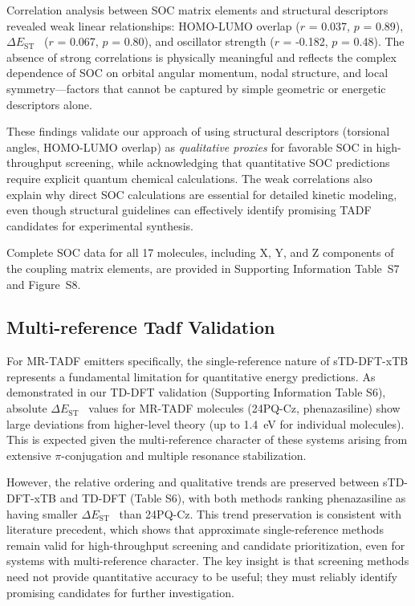 \documentclass[journal=jcisd8,manuscript=article,keywords=true]{achemso}
\newcommand{\deltaest}{$\Delta E_{\text{ST}}$}
\begin{document}
Correlation analysis between SOC matrix elements and structural descriptors revealed weak linear relationships: HOMO-LUMO overlap ($r$ = 0.037, $p$ = 0.89), \deltaest~ ($r$ = 0.067, $p$ = 0.80), and oscillator strength ($r$ = -0.182, $p$ = 0.48). The absence of strong correlations is physically meaningful and reflects the complex dependence of SOC on orbital angular momentum, nodal structure, and local symmetry---factors that cannot be captured by simple geometric or energetic descriptors alone.\cite{ElSayed1968,Marian2012}

These findings validate our approach of using structural descriptors (torsional angles, HOMO-LUMO overlap) as \textit{qualitative proxies} for favorable SOC in high-throughput screening, while acknowledging that quantitative SOC predictions require explicit quantum chemical calculations. The weak correlations also explain why direct SOC calculations are essential for detailed kinetic modeling, even though structural guidelines can effectively identify promising TADF candidates for experimental synthesis.

Complete SOC data for all 17 molecules, including X, Y, and Z components of the coupling matrix elements, are provided in Supporting Information Table~S7 and Figure~S8.

\subsection{Multi-reference Tadf Validation}\label{sec:mr_tadf_validation}

For MR-TADF emitters specifically, the single-reference nature of sTD-DFT-xTB represents a fundamental limitation for quantitative energy predictions. As demonstrated in our TD-DFT validation (Supporting Information Table S6), absolute \deltaest~ values for MR-TADF molecules (24PQ-Cz, phenazasiline) show large deviations from higher-level theory (up to \qty{1.4}{\electronvolt} for individual molecules). This is expected given the multi-reference character of these systems arising from extensive $\pi$-conjugation and multiple resonance stabilization.\cite{Hatakeyama2016,Kondo2019}

However, the relative ordering and qualitative trends are preserved between sTD-DFT-xTB and TD-DFT (Table S6), with both methods ranking phenazasiline as having smaller \deltaest~ than 24PQ-Cz. This trend preservation is consistent with literature precedent,\cite{Olivier2022,Gomez-Bombarelli2016} which shows that approximate single-reference methods remain valid for high-throughput screening and candidate prioritization, even for systems with multi-reference character. The key insight is that screening methods need not provide quantitative accuracy to be useful; they must reliably identify promising candidates for further investigation.
\end{document}
